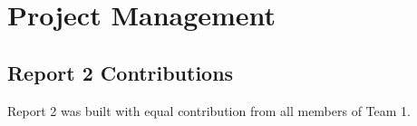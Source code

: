 \chapter{Project Management}
\label{managment}
\section{Report 2 Contributions}

Report 2 was built with equal contribution from all members of Team 1.

